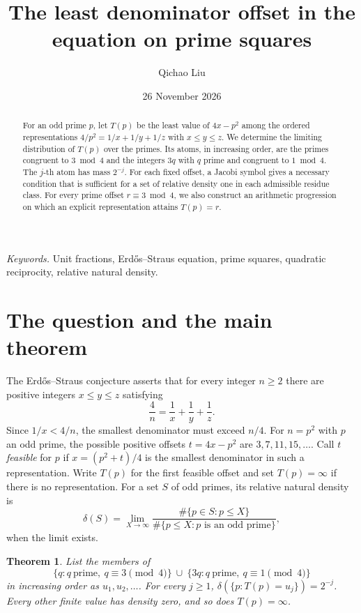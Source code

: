 \documentclass[11pt,a4paper]{article}
\title{The least denominator offset in the \ES{} equation on prime squares}
\author{Qichao Liu}
\date{26 November 2026}
\newtheorem{theorem}{Theorem}
\theoremstyle{definition}
\newcommand{\ES}{Erd\H{o}s--Straus}
\begin{document}
\maketitle

\begin{abstract}
For an odd prime \(p\), let \(T(p)\) be the least value of \(4x-p^2\)
among the ordered representations \(4/p^2=1/x+1/y+1/z\) with
\(x\le y\le z\). We determine the limiting distribution of \(T(p)\) over
the primes. Its atoms, in increasing order, are the primes congruent to
\(3\bmod 4\) and the integers \(3q\) with \(q\) prime and congruent to
\(1\bmod 4\). The \(j\)-th atom has mass \(2^{-j}\). For each fixed
offset, a Jacobi symbol gives a necessary condition that is sufficient
for a set of relative density one in each admissible residue class.
For every prime offset \(r\equiv3\bmod4\), we also construct an
arithmetic progression on which an explicit representation attains
\(T(p)=r\).
\end{abstract}

\noindent\textit{Keywords.} Unit fractions, \ES{} equation, prime squares,
quadratic reciprocity, relative natural density.

\section{The question and the main theorem}

The \ES{} conjecture asserts that for every integer \(n\ge2\) there are
positive integers \(x\le y\le z\) satisfying
\[
  \frac4n=\frac1x+\frac1y+\frac1z.
\]
Since \(1/x<4/n\), the smallest denominator must exceed \(n/4\).
For \(n=p^2\) with \(p\) an odd prime, the possible positive offsets
\(t=4x-p^2\) are \(3,7,11,15,\ldots\).
Call \(t\) \emph{feasible} for \(p\) if \(x=(p^2+t)/4\) is the smallest
denominator in such a representation. Write \(T(p)\) for the first
feasible offset and set \(T(p)=\infty\) if there is no representation.
For a set \(S\) of odd primes, its relative natural density is
\[
  \delta(S)=\lim_{X\to\infty}
  \frac{\#\{p\in S:p\le X\}}{\#\{p\le X:p\text{ is an odd prime}\}},
\]
when the limit exists.

\begin{theorem}\label{thm:law}
List the members of
\[
  \{q:q\ \text{prime},\ q\equiv3\pmod4\}
  \ \cup\
  \{3q:q\ \text{prime},\ q\equiv1\pmod4\}
\]
in increasing order as \(u_1,u_2,\ldots\).
For every \(j\ge1\),
\(\delta(\{p:T(p)=u_j\})=2^{-j}\).
Every other finite value has density zero, and so does \(T(p)=\infty\).
\end{theorem}
\end{document}
